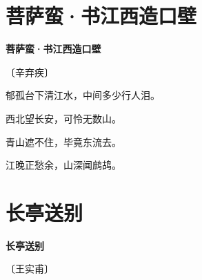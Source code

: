\documentclass[12pt,UTF-8,openany,fontset=none]{ctexbook}
\begin{document}
\vspace{8pt}
\clearpage

\section{菩萨蛮·书江西造口壁}


\begin{center}
    {\bfseries 菩萨蛮·书江西造口壁}

    \vspace{18pt}

    \begin{large}\xuwen
        〔辛弃疾〕
    \end{large}

\end{center}

    \vspace{18pt}  %

\begin{center}
    \begin{Large}

        郁孤台下清江水，中间多少行人泪。

        西北望长安，可怜无数山。

        \vspace{18pt}  %

        青山遮不住，毕竟东流去。

        江晚正愁余，山深闻鹧鸪。

    \end{Large}

\end{center}

\vspace{8pt}
\clearpage

\section{长亭送别}


\begin{center}
    {\bfseries 长亭送别}

    \vspace{18pt}

    \begin{large}\xuwen
        〔王实甫〕
    \end{large}

\end{center}
\end{document}
